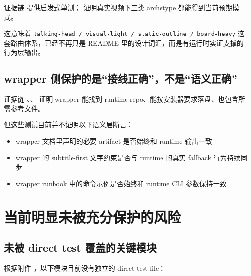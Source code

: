 \documentclass[a4paper]{article}
\begin{document}
\begin{evidencebox}{证据链}
 提供启发式单测； 证明真实视频下三类 archetype 都能得到当前预期模式。
\end{evidencebox}

这意味着 \texttt{talking-head / visual-light / static-outline / board-heavy} 这套路由体系，已经不再只是 README 里的设计词汇，而是有运行时实证支撑的行为层输出。

\subsection{wrapper 侧保护的是“接线正确”，不是“语义正确”}

\begin{evidencebox}{证据链}
、、 证明 wrapper 能找到 runtime repo、能按安装器要求落盘、也包含所需参考文件。
\end{evidencebox}

但这些测试目前并不证明以下语义层断言：

\begin{itemize}
\item wrapper 文档里声明的必要 artifact 是否始终和 runtime 输出一致
\item wrapper 的 subtitle-first 文字约束是否与 runtime 的真实 fallback 行为持续同步
\item wrapper runbook 中的命令示例是否始终和 runtime CLI 参数保持一致
\end{itemize}

\section{当前明显未被充分保护的风险}

\subsection{未被 direct test 覆盖的关键模块}

根据附件 ，以下模块目前没有独立的 direct test file：
\end{document}
